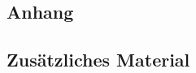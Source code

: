 \begin{appendices}

\chapter{Anhang}
\label{appendix}

\section{Zusätzliches Material}

\end{appendices}
